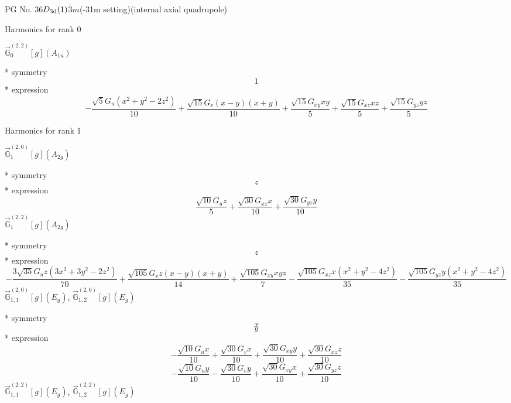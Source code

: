 \documentclass[fleqn,8pt]{jsarticle}
\begin{document}
\setcounter{MaxMatrixCols}{32}

\renewcommand{\tablename}{Table~}
\renewcommand{\figurename}{Figure~}
\begin{center}
\LARGE
PG No. 36\quad$D_{\rm 3d}(1)$\quad$\bar{3}m$\quad(-31m setting)\quad[ trigonal ] (internal axial quadrupole)
\end{center}

\noindent * Harmonics for rank 0

\noindent\quad $\vec{\mathbb{G}}_{0}^{(2,2)}[g](A_{1u})$

\noindent\quad ** symmetry
\begin{dmath*}
1
\end{dmath*}
\noindent\quad ** expression
\begin{dmath*}
- \frac{\sqrt{5} G_{u} \left(x^{2} + y^{2} - 2 z^{2}\right)}{10} + \frac{\sqrt{15} G_{v} \left(x - y\right) \left(x + y\right)}{10} + \frac{\sqrt{15} G_{xy} x y}{5} + \frac{\sqrt{15} G_{xz} x z}{5} + \frac{\sqrt{15} G_{yz} y z}{5}
\end{dmath*}

\noindent * Harmonics for rank 1

\noindent\quad $\vec{\mathbb{G}}_{1}^{(2,0)}[g](A_{2g})$

\noindent\quad ** symmetry
\begin{dmath*}
z
\end{dmath*}
\noindent\quad ** expression
\begin{dmath*}
\frac{\sqrt{10} G_{u} z}{5} + \frac{\sqrt{30} G_{xz} x}{10} + \frac{\sqrt{30} G_{yz} y}{10}
\end{dmath*}
\noindent\quad $\vec{\mathbb{G}}_{1}^{(2,2)}[g](A_{2g})$

\noindent\quad ** symmetry
\begin{dmath*}
z
\end{dmath*}
\noindent\quad ** expression
\begin{dmath*}
- \frac{3 \sqrt{35} G_{u} z \left(3 x^{2} + 3 y^{2} - 2 z^{2}\right)}{70} + \frac{\sqrt{105} G_{v} z \left(x - y\right) \left(x + y\right)}{14} + \frac{\sqrt{105} G_{xy} x y z}{7} - \frac{\sqrt{105} G_{xz} x \left(x^{2} + y^{2} - 4 z^{2}\right)}{35} - \frac{\sqrt{105} G_{yz} y \left(x^{2} + y^{2} - 4 z^{2}\right)}{35}
\end{dmath*}
\noindent\quad $\vec{\mathbb{G}}_{1,1}^{(2,0)}[g](E_{g})$, $\vec{\mathbb{G}}_{1,2}^{(2,0)}[g](E_{g})$

\noindent\quad ** symmetry
\begin{dmath*}
x
\end{dmath*}
\begin{dmath*}
y
\end{dmath*}
\noindent\quad ** expression
\begin{dmath*}
- \frac{\sqrt{10} G_{u} x}{10} + \frac{\sqrt{30} G_{v} x}{10} + \frac{\sqrt{30} G_{xy} y}{10} + \frac{\sqrt{30} G_{xz} z}{10}
\end{dmath*}
\begin{dmath*}
- \frac{\sqrt{10} G_{u} y}{10} - \frac{\sqrt{30} G_{v} y}{10} + \frac{\sqrt{30} G_{xy} x}{10} + \frac{\sqrt{30} G_{yz} z}{10}
\end{dmath*}
\noindent\quad $\vec{\mathbb{G}}_{1,1}^{(2,2)}[g](E_{g})$, $\vec{\mathbb{G}}_{1,2}^{(2,2)}[g](E_{g})$
\end{document}
